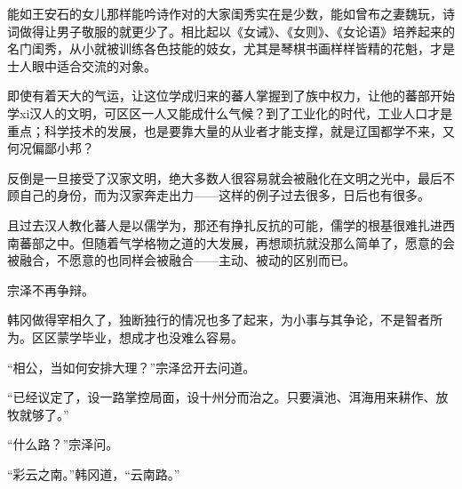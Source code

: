 能如王安石的女儿那样能吟诗作对的大家闺秀实在是少数，能如曾布之妻魏玩，诗词做得让男子敬服的就更少了。相比起以《女诫》、《女则》、《女论语》培养起来的名门闺秀，从小就被训练各色技能的妓女，尤其是琴棋书画样样皆精的花魁，才是士人眼中适合交流的对象。

即使有着天大的气运，让这位学成归来的蕃人掌握到了族中权力，让他的蕃部开始学xi汉人的文明，可区区一人又能成什么气候？到了工业化的时代，工业人口才是重点；科学技术的发展，也是要靠大量的从业者才能支撑，就是辽国都学不来，又何况偏鄙小邦？

反倒是一旦接受了汉家文明，绝大多数人很容易就会被融化在文明之光中，最后不顾自己的身份，而为汉家奔走出力——这样的例子过去很多，日后也有很多。

且过去汉人教化蕃人是以儒学为，那还有挣扎反抗的可能，儒学的根基很难扎进西南蕃部之中。但随着气学格物之道的大发展，再想顽抗就没那么简单了，愿意的会被融合，不愿意的也同样会被融合——主动、被动的区别而已。

宗泽不再争辩。

韩冈做得宰相久了，独断独行的情况也多了起来，为小事与其争论，不是智者所为。区区蒙学毕业，想成才也没难么容易。

“相公，当如何安排大理？”宗泽岔开去问道。

“已经议定了，设一路掌控局面，设十州分而治之。只要滇池、洱海用来耕作、放牧就够了。”

“什么路？”宗泽问。

“彩云之南。”韩冈道，“云南路。”
